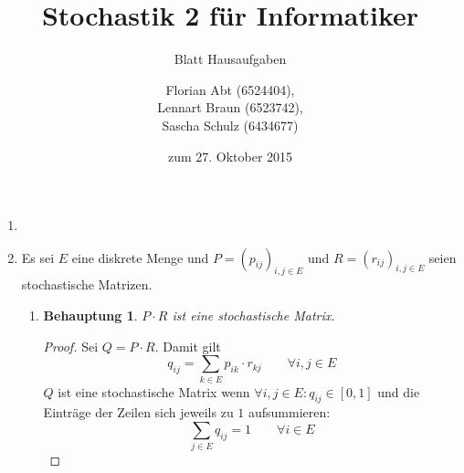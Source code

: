 \documentclass[a4paper]{scrartcl}
\title{Stochastik 2 für Informatiker}
\subtitle{Blatt {\blattnr} Hausaufgaben}
\author{
    Florian Abt (6524404), \\
    Lennart Braun (6523742), \\
    Sascha Schulz (6434677)
}
\date{zum 27. Oktober 2015}
\newtheorem*{behaupt}{Behauptung}
\def \blattnr {2}
\begin{document}
\maketitle

\begin{enumerate}[label=\bfseries \blattnr.\arabic*]
    \item

    \item
        Es sei $E$ eine diskrete Menge und $P = (p_{ij})_{i,j \in E}$ und $R =
        (r_{ij})_{i,j \in E}$ seien stochastische Matrizen.
        \begin{enumerate}[label=\alph*)]
            \item
                \begin{behaupt}
                    $P \cdot R$ ist eine stochastische Matrix.
                \end{behaupt}
                \begin{proof}
                    Sei $Q = P \cdot R$. Damit gilt
                    \begin{equation*}
                        q_{ij} = \sum_{k \in E} p_{ik} \cdot r_{kj}
                        \qquad
                        \forall i,j \in E
                    \end{equation*}
                    $Q$ ist eine stochastische Matrix wenn $\forall i,j \in E :
                    q_{ij} \in [0,1]$ und die Einträge der Zeilen sich jeweils
                    zu $1$ aufsummieren:
                    \begin{equation*}
                        \sum_{j \in E} q_{ij} = 1
                        \qquad
                        \forall i \in E
                    \end{equation*}


\end{proof}
\end{enumerate}
\end{enumerate}
\end{document}

